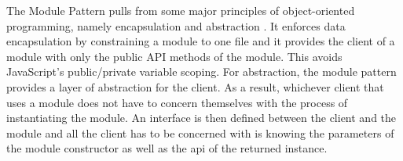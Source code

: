 The Module Pattern pulls from some major principles  of object-oriented programming, namely encapsulation and abstraction \cite{davidsevcik}. It enforces data encapsulation by constraining a module to one file and it provides the client of a module with only the public API methods of the module. This avoids JavaScript's public/private variable scoping. For abstraction, the module pattern provides a layer of abstraction for the client. As a result, whichever client that uses a module does not have to concern themselves with the process of instantiating the module. An interface is then defined between the client and the module and all the client has to be concerned with is knowing the parameters of the module constructor as well as the api of the returned instance.